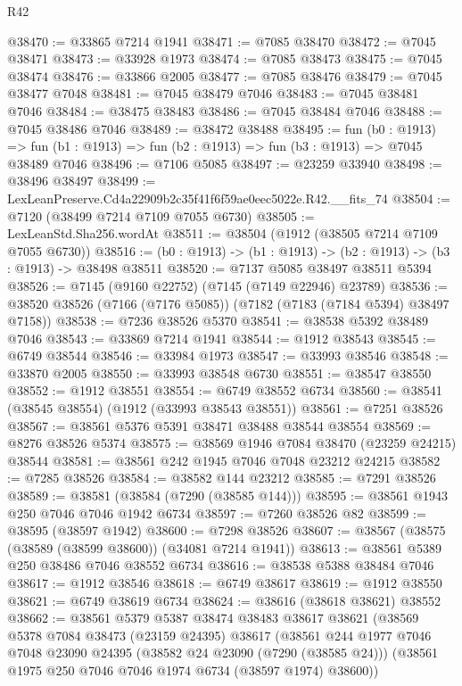 \begin{lexlean}{R42}
\begin{coremodule}
{@38470 := @33865 @7214 @1941
@38471 := @7085 @38470
@38472 := @7045 @38471
@38473 := @33928 @1973
@38474 := @7085 @38473
@38475 := @7045 @38474
@38476 := @33866 @2005
@38477 := @7085 @38476
@38479 := @7045 @38477 @7048
@38481 := @7045 @38479 @7046
@38483 := @7045 @38481 @7046
@38484 := @38475 @38483
@38486 := @7045 @38484 @7046
@38488 := @7045 @38486 @7046
@38489 := @38472 @38488
@38495 := fun (b0 : @1913) =>
  fun (b1 : @1913) => fun (b2 : @1913) => fun (b3 : @1913) => @7045 @38489 @7046
@38496 := @7106 @5085
@38497 := @23259 @33940
@38498 := @38496 @38497
@38499 := LexLeanPreserve.Cd4a22909b2c35f41f6f59ae0eec5022e.R42.__fits_74
@38504 := @7120 (@38499 @7214 @7109 @7055 @6730)
@38505 := LexLeanStd.Sha256.wordAt
@38511 := @38504 (@1912 (@38505 @7214 @7109 @7055 @6730))
@38516 := (b0 : @1913) -> (b1 : @1913) -> (b2 : @1913) -> (b3 : @1913) -> @38498 @38511
@38520 := @7137 @5085 @38497 @38511 @5394
@38526 := @7145 (@9160 @22752) (@7145 (@7149 @22946) @23789)
@38536 := @38520 @38526 (@7166 (@7176 @5085)) (@7182 (@7183 (@7184 @5394) @38497 @7158))
@38538 := @7236 @38526 @5370
@38541 := @38538 @5392 @38489 @7046
@38543 := @33869 @7214 @1941
@38544 := @1912 @38543
@38545 := @6749 @38544
@38546 := @33984 @1973
@38547 := @33993 @38546
@38548 := @33870 @2005
@38550 := @33993 @38548 @6730
@38551 := @38547 @38550
@38552 := @1912 @38551
@38554 := @6749 @38552 @6734
@38560 := @38541 (@38545 @38554) (@1912 (@33993 @38543 @38551))
@38561 := @7251 @38526
@38567 := @38561 @5376 @5391 @38471 @38488 @38544 @38554
@38569 := @8276 @38526 @5374
@38575 := @38569 @1946 @7084 @38470 (@23259 @24215) @38544
@38581 := @38561 @242 @1945 @7046 @7048 @23212 @24215
@38582 := @7285 @38526
@38584 := @38582 @144 @23212
@38585 := @7291 @38526
@38589 := @38581 (@38584 (@7290 (@38585 @144)))
@38595 := @38561 @1943 @250 @7046 @7046 @1942 @6734
@38597 := @7260 @38526 @82
@38599 := @38595 (@38597 @1942)
@38600 := @7298 @38526
@38607 := @38567 (@38575 (@38589 (@38599 @38600)) (@34081 @7214 @1941))
@38613 := @38561 @5389 @250 @38486 @7046 @38552 @6734
@38616 := @38538 @5388 @38484 @7046
@38617 := @1912 @38546
@38618 := @6749 @38617
@38619 := @1912 @38550
@38621 := @6749 @38619 @6734
@38624 := @38616 (@38618 @38621) @38552
@38662 := @38561
    @5379
    @5387
    @38474
    @38483
    @38617
    @38621
    (@38569
      @5378
      @7084
      @38473
      (@23159 @24395)
      @38617
      (@38561
        @244
        @1977
        @7046
        @7048
        @23090
        @24395
        (@38582 @24 @23090 (@7290 (@38585 @24)))
        (@38561 @1975 @250 @7046 @7046 @1974 @6734 (@38597 @1974) @38600))
}
\end{coremodule}
\end{lexlean}

